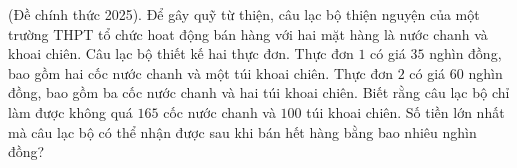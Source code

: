 \begin{vd} %
	(Đề chính thức 2025). Để gây quỹ từ thiện, câu lạc bộ thiện nguyện của một trường THPT tổ chức hoat động bán hàng với hai mặt hàng là nước chanh và khoai chiên. Câu lạc bộ thiết kế hai thực đơn. Thực đơn $1$ có giá $35$ nghìn đồng, bao gồm hai cốc nước chanh và một túi khoai chiên. Thực đơn $2$ có giá $60$ nghìn đồng, bao gồm ba cốc nước chanh và hai túi khoai chiên. Biết rằng câu lạc bộ chỉ làm được không quá $165$ cốc nước chanh và $100$ túi khoai chiên. Số tiền lớn nhất mà câu lạc bộ có thể nhận được sau khi bán hết hàng bằng bao nhiêu nghìn đồng?
\end{vd}
